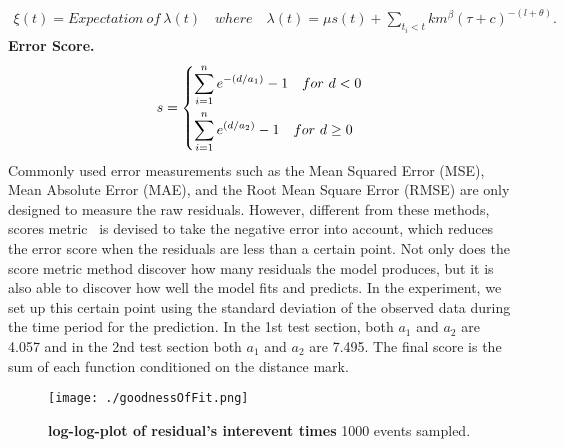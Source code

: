 \documentclass[10pt,letterpaper]{article}
\begin{document}
\begin{align}
%
\xi(t)=Expectation \ of \ \lambda(t) \quad where \quad \lambda(t)=\mu s(t)+\sum_{t_i < t}km^{\beta}(\tau + c)^{-(l+\theta)}.
\label{eq:13}
\end{align}  
%
%
\textbf{Error Score.	}$  $
\begin{align}
s=
\begin{dcases}
\sum_{i=1}^{n} e^{-(d/a_1)} -1 \quad for\ d < 0 \\
\sum_{i=1}^{n} e^{(d/a_2)} -1 \quad for\ d \geq 0
\end{dcases}
\label{eq:14}
\end{align}
Commonly used error measurements such as the Mean Squared Error (MSE), Mean Absolute Error (MAE), and the Root Mean Square Error (RMSE) are only designed to measure the raw residuals. However, different from these methods, scores metric~\cite{bib22} is devised to take the negative error into account, which reduces the error score when the residuals are less than a certain point. Not only does the score metric method discover how many residuals the model produces, but it is also able to discover how well the model fits and predicts.  In the experiment, we set up this certain point using the standard deviation of the observed data during the time period for the prediction. In the 1st test section, both $a_1$ and $a_2$ are 4.057 and in the 2nd test section both $a_1$ and $a_2$  are 7.495. The final score is the sum of each function conditioned on the distance mark.
%


\begin{figure}[H]
\centering
\texttt{[image: ./goodnessOfFit.png]}
\caption{{\bf log-log-plot of residual’s interevent times} 1000 events sampled.}
\label{fig3}
 \end{figure}
\end{document}
